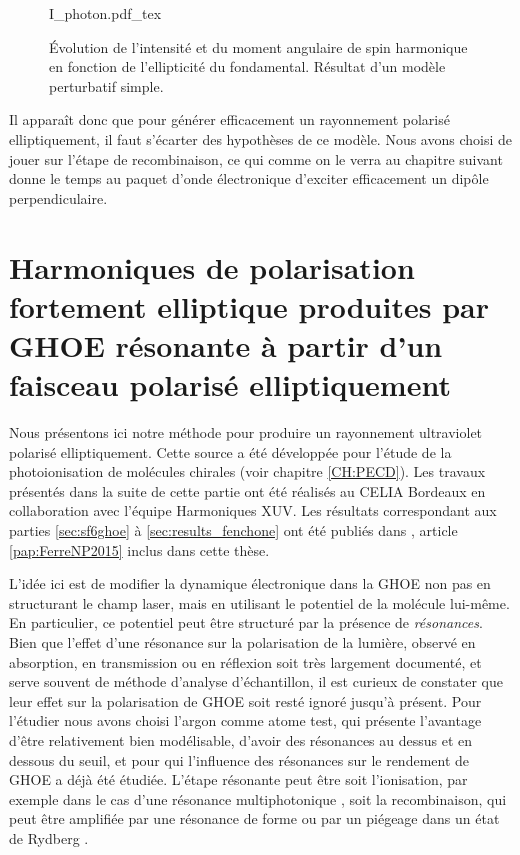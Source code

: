 \begin{figure}[!ht]
\centering
\def\svgwidth{1\columnwidth}
{I_photon.pdf_tex}
\caption{\'Evolution de l'intensité et du moment angulaire de spin harmonique en fonction de l'ellipticité du fondamental. Résultat d'un modèle perturbatif simple.}
\label{fig:mas_photon}
\end{figure}

Il apparaît donc que pour générer efficacement un rayonnement polarisé elliptiquement, il faut s'écarter des hypothèses de ce modèle. Nous avons choisi de jouer sur l'étape de recombinaison, ce qui comme on le verra au chapitre suivant donne le temps au paquet d'onde électronique d'exciter efficacement un dipôle perpendiculaire. 

\chapter[Harmoniques de polarisation fortement elliptique produites par GHOE résonante]{Harmoniques de polarisation fortement elliptique produites par GHOE résonante à partir d'un faisceau polarisé elliptiquement}
\label{CH:Circular_HHG}
Nous présentons ici notre méthode pour produire un rayonnement ultraviolet polarisé elliptiquement. Cette source a été développée pour l'étude de la photoionisation de molécules chirales (voir chapitre \ref{CH:PECD}). Les travaux présentés dans la suite de cette partie ont été réalisés au CELIA Bordeaux en collaboration avec l'équipe Harmoniques XUV. Les résultats correspondant aux parties \ref{sec:sf6ghoe} à \ref{sec:results_fenchone} ont été publiés dans , article \ref{pap:FerreNP2015} inclus dans cette thèse.

L'idée ici est de modifier la dynamique électronique dans la GHOE non pas en structurant le champ laser, mais en utilisant le potentiel de la molécule lui-même. En particulier, ce potentiel peut être structuré par la présence de \textit{résonances}. Bien que l'effet d'une résonance sur la polarisation de la lumière, observé en absorption, en transmission ou en réflexion soit très largement documenté, et serve souvent de méthode d'analyse d'échantillon, il est curieux de constater que leur effet sur la polarisation de GHOE soit resté ignoré jusqu'à présent. Pour l'étudier nous avons choisi l'argon comme atome test, qui présente l'avantage d'être relativement bien modélisable, d'avoir des résonances au dessus et en dessous du seuil, et pour qui l'influence des résonances sur le rendement de GHOE a déjà été étudiée. L'étape résonante peut être soit l'ionisation, par exemple dans le cas d'une résonance multiphotonique , soit la recombinaison, qui peut être amplifiée par une résonance de forme ou par un piégeage dans un état de Rydberg .

